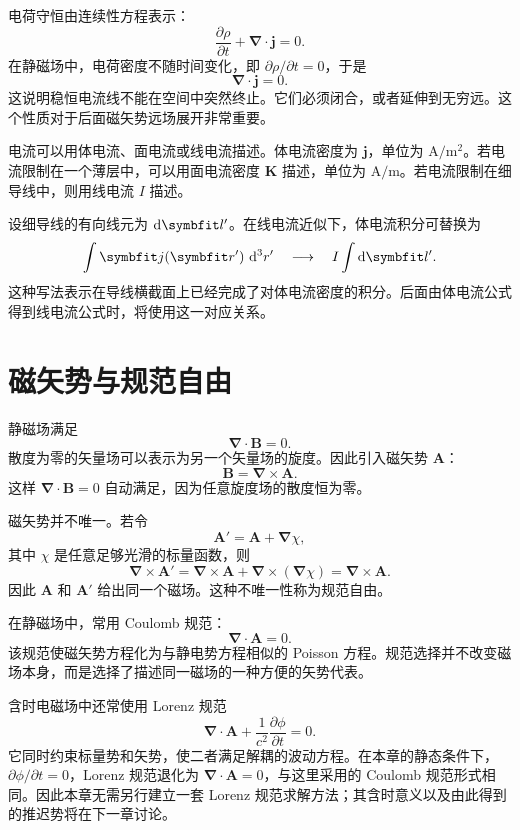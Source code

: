 电荷守恒由连续性方程表示：
\[
\frac{\partial\rho}{\partial t}
+
\bm{\nabla}\cdot\bm{j}=0.
\]
在静磁场中，电荷密度不随时间变化，即 $\partial\rho/\partial t=0$，于是
\begin{equation}
	\bm{\nabla}\cdot\bm{j}=0.
	\label{eq:11:steady-current-continuity}
\end{equation}
这说明稳恒电流线不能在空间中突然终止。它们必须闭合，或者延伸到无穷远。这个性质对于后面磁矢势远场展开非常重要。

电流可以用体电流、面电流或线电流描述。体电流密度为 $\bm{j}$，单位为 $\mathrm{A}/\mathrm{m}^{2}$。若电流限制在一个薄层中，可以用面电流密度 $\bm{K}$ 描述，单位为 $\mathrm{A}/\mathrm{m}$。若电流限制在细导线中，则用线电流 $I$ 描述。

设细导线的有向线元为 $\dif\bm{l}'$。在线电流近似下，体电流积分可替换为
\[
\int \bm{j}(\bm{r}')\,\dif^{3}r'
\quad \longrightarrow \quad
I\int \dif\bm{l}'.
\]
这种写法表示在导线横截面上已经完成了对体电流密度的积分。后面由体电流公式得到线电流公式时，将使用这一对应关系。

\section{磁矢势与规范自由}

静磁场满足
\[
\bm{\nabla}\cdot\bm{B}=0.
\]
散度为零的矢量场可以表示为另一个矢量场的旋度。因此引入磁矢势 $\bm{A}$：
\begin{equation}
	\bm{B}
	=
	\bm{\nabla}\times\bm{A}.
	\label{eq:11:b-curl-a}
\end{equation}
这样 $\bm{\nabla}\cdot\bm{B}=0$ 自动满足，因为任意旋度场的散度恒为零。

磁矢势并不唯一。若令
\[
\bm{A}'
=
\bm{A}
+
\bm{\nabla}\chi,
\]
其中 $\chi$ 是任意足够光滑的标量函数，则
\[
\bm{\nabla}\times\bm{A}'
=
\bm{\nabla}\times\bm{A}
+
\bm{\nabla}\times(\bm{\nabla}\chi)
=
\bm{\nabla}\times\bm{A}.
\]
因此 $\bm{A}$ 和 $\bm{A}'$ 给出同一个磁场。这种不唯一性称为规范自由。

在静磁场中，常用 Coulomb 规范：
\begin{equation}
	\bm{\nabla}\cdot\bm{A}=0.
	\label{eq:11:coulomb-gauge}
\end{equation}
该规范使磁矢势方程化为与静电势方程相似的 Poisson 方程。规范选择并不改变磁场本身，而是选择了描述同一磁场的一种方便的矢势代表。

含时电磁场中还常使用 Lorenz 规范
\[
\bm{\nabla}\cdot\bm{A}
+
\frac{1}{c^{2}}\frac{\partial\phi}{\partial t}
=0.
\]
它同时约束标量势和矢势，使二者满足解耦的波动方程。在本章的静态条件下，
$\partial\phi/\partial t=0$，Lorenz 规范退化为
$\bm{\nabla}\cdot\bm{A}=0$，与这里采用的 Coulomb 规范形式相同。因此本章无需另行建立一套 Lorenz 规范求解方法；其含时意义以及由此得到的推迟势将在下一章讨论。

